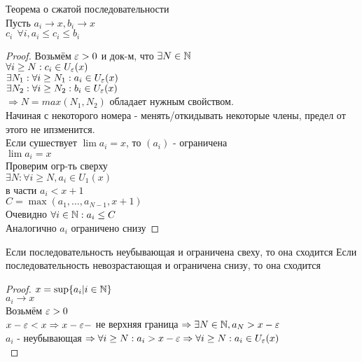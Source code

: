 \begin{theorem} Теорема о сжатой последовательности\\
	Пусть $ a_i \rightarrow x, b_i \rightarrow x $ \\
	$ c_i \ \ \forall i, a_i \leq c_i \leq b_i $ 
	\begin{proof}
		Возьмём $ \varepsilon > 0 $ и док-м, что $ \exists N \in \mathbb{N} $ \\
		$ \forall i \geq N : c_i \in U_{\varepsilon} (x) $ \\
		$ \exists N_1 : \forall i \geq N_1 : a_i \in U_{\varepsilon} (x) $\\
		$ \exists N_2 : \forall i \geq N_2 : b_i \in U_{\varepsilon} (x) $\\
		$ \Rightarrow N = max(N_1, N_2) $ обладает нужным 		свойством. \\
		Начиная с некоторого номера - менять/откидывать некоторые члены, предел от этого не ипзменится. \\

		Если сушествует $ \lim a_i = x $, то $(a_i)$ - ограничена\\
		$ \lim a_i = x $ \\
		Проверим огр-ть сверху \\
		$ \exists N : \forall i \geq N, a_i \in U_1 (x) $ \\
		в части $ a_i < x + 1 $ \\
		$ C = \max( a_1, \dots, a_{N-1}, x + 1) $ \\
		Очевидно $ \forall i \in \mathbb{N} : a_i \leq C $ \\
		Аналогично $ a_i $ ограничено снизу 
	\end{proof}
\end{theorem}

Если последовательность неубывающая и ограничена свеху, то она сходится
Если последовательность невозрастающая и ограничена снизу, то она сходится

\begin{proof}
	$ x = \sup\{a_i | i \in \mathbb{N}\} $ \\
	$ a_i \rightarrow x $\\
	Возьмём $ \varepsilon > 0 $\\
	$ x - \varepsilon < x \Rightarrow x - \varepsilon  - $ не верхняя граница $ \Rightarrow \exists N \in \mathbb{N}, a_N > x-\varepsilon $ \\
	$ a_i $ - неубывающая $ \Rightarrow \forall i \geq N : a_i > x-\varepsilon \Rightarrow \forall i \geq N : a_i \in U_{\varepsilon} (x)$\\
\end{proof}

